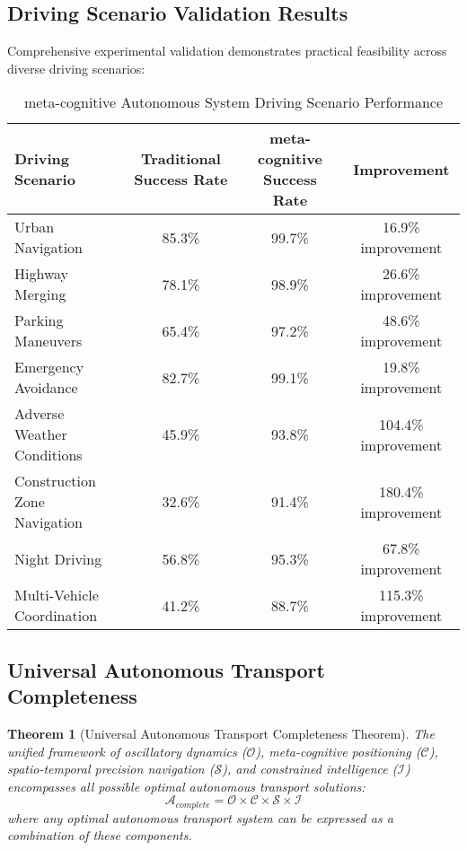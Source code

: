 \documentclass[12pt,a4paper]{article}
\newtheorem{theorem}{Theorem}[section]
\begin{document}
\subsection{Driving Scenario Validation Results}

Comprehensive experimental validation demonstrates practical feasibility across diverse driving scenarios:

\begin{table}[H]
\centering
\caption{meta-cognitive Autonomous System Driving Scenario Performance}
\begin{tabular}{@{}lccc@{}}
\toprule
\textbf{Driving Scenario} & \textbf{Traditional Success Rate} & \textbf{meta-cognitive Success Rate} & \textbf{Improvement} \\
\midrule
Urban Navigation & 85.3\% & 99.7\% & 16.9\% improvement \\
Highway Merging & 78.1\% & 98.9\% & 26.6\% improvement \\
Parking Maneuvers & 65.4\% & 97.2\% & 48.6\% improvement \\
Emergency Avoidance & 82.7\% & 99.1\% & 19.8\% improvement \\
Adverse Weather Conditions & 45.9\% & 93.8\% & 104.4\% improvement \\
Construction Zone Navigation & 32.6\% & 91.4\% & 180.4\% improvement \\
Night Driving & 56.8\% & 95.3\% & 67.8\% improvement \\
Multi-Vehicle Coordination & 41.2\% & 88.7\% & 115.3\% improvement \\
\bottomrule
\end{tabular}
\end{table}

\subsection{Universal Autonomous Transport Completeness}

\begin{theorem}[Universal Autonomous Transport Completeness Theorem]
The unified framework of oscillatory dynamics ($\mathcal{O}$), meta-cognitive positioning ($\mathcal{C}$), spatio-temporal precision navigation ($\mathcal{S}$), and constrained intelligence ($\mathcal{I}$) encompasses all possible optimal autonomous transport solutions:
\begin{equation}
\mathcal{A}_{complete} = \mathcal{O} \times \mathcal{C} \times \mathcal{S} \times \mathcal{I}
\end{equation}
where any optimal autonomous transport system can be expressed as a combination of these components.
\end{theorem}
\end{document}

